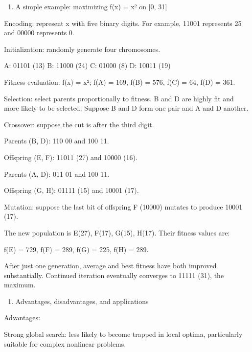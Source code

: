 \begin{enumerate}
\def\labelenumi{\arabic{enumi}.}
\setcounter{enumi}{2}
\tightlist
\item
  A simple example: maximizing f(x) = x² on {[}0, 31{]}
\end{enumerate}

Encoding: represent x with five binary digits. For example, 11001 represents 25 and 00000 represents 0.

Initialization: randomly generate four chromosomes.

A: 01101 (13) B: 11000 (24) C: 01000 (8) D: 10011 (19)

Fitness evaluation: f(x) = x²; f(A) = 169, f(B) = 576, f(C) = 64, f(D) = 361.

Selection: select parents proportionally to fitness. B and D are highly fit and more likely to be selected. Suppose B and D form one pair and A and D another.

Crossover: suppose the cut is after the third digit.

Parents (B, D): 110 \textbar{} 00 and 100 \textbar{} 11.

Offspring (E, F): 11011 (27) and 10000 (16).

Parents (A, D): 011 \textbar{} 01 and 100 \textbar{} 11.

Offspring (G, H): 01111 (15) and 10001 (17).

Mutation: suppose the last bit of offspring F (10000) mutates to produce 10001 (17).

The new population is E(27), F(17), G(15), H(17). Their fitness values are:

f(E) = 729, f(F) = 289, f(G) = 225, f(H) = 289.

After just one generation, average and best fitness have both improved substantially. Continued iteration eventually converges to 11111 (31), the maximum.

\begin{enumerate}
\def\labelenumi{\arabic{enumi}.}
\setcounter{enumi}{3}
\tightlist
\item
  Advantages, disadvantages, and applications
\end{enumerate}

Advantages:

Strong global search: less likely to become trapped in local optima, particularly suitable for complex nonlinear problems.

